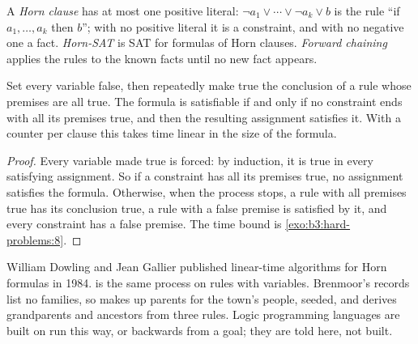 \begin{definition}\label{def:b3:hard-problems:horn}
A \emph{Horn clause} has at most one positive literal: $\neg a_1 \vee \cdots \vee \neg a_k \vee b$ is the rule ``if $a_1, \ldots, a_k$ then $b$''; with no positive literal it is a constraint, and with no negative one a fact. \emph{Horn-SAT} is SAT for formulas of Horn clauses. \emph{Forward chaining} applies the rules to the known facts until no new fact appears.
\end{definition}

\begin{theorem}\label{thm:b3:hard-problems:horn}
Set every variable false, then repeatedly make true the conclusion of a rule whose premises are all true. The formula is satisfiable if and only if no constraint ends with all its premises true, and then the resulting assignment satisfies it. With a counter per clause this takes time linear in the size of the formula.
\end{theorem}

\begin{proof}
Every variable made true is forced: by induction, it is true in every satisfying assignment. So if a constraint has all its premises true, no assignment satisfies the formula. Otherwise, when the process stops, a rule with all premises true has its conclusion true, a rule with a false premise is satisfied by it, and every constraint has a false premise. The time bound is \cref{exo:b3:hard-problems:8}.
\end{proof}

William Dowling and Jean Gallier published linear-time algorithms for Horn formulas in 1984. %
 is the same process on rules with variables. Brenmoor's records list no families, so  makes up parents for the town's people, seeded, and derives grandparents and ancestors from three rules. Logic programming languages are built on  run this way, or backwards from a goal; they are told here, not built.

\label{lst:b3:hard-problems:horn}

\label{lst:b3:hard-problems:rules}

